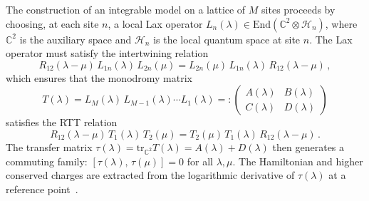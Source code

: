 \documentclass[11pt,a4paper]{article}
\theoremstyle{definition}
\begin{document}
The construction of an integrable model on a lattice of $M$ sites
proceeds by choosing, at each site $n$, a local Lax operator
$L_n(\lambda) \in \mathrm{End}(\mathbb{C}^2 \otimes
\mathcal{H}_n)$, where $\mathbb{C}^2$ is the auxiliary space and
$\mathcal{H}_n$ is the local quantum space at site $n$.  The Lax
operator must satisfy the intertwining relation
\begin{equation}\label{eq.RLL}
  R_{12}(\lambda - \mu)\,L_{1n}(\lambda)\,
  L_{2n}(\mu)
  = L_{2n}(\mu)\,L_{1n}(\lambda)\,
  R_{12}(\lambda - \mu)\,,
\end{equation}
which ensures that the monodromy matrix
\begin{equation}\label{eq.monodromy}
  T(\lambda) = L_M(\lambda)\,L_{M-1}(\lambda)
  \cdots L_1(\lambda)
  =:
  \begin{pmatrix}
    A(\lambda) & B(\lambda) \\ C(\lambda) & D(\lambda)
  \end{pmatrix}
\end{equation}
satisfies the RTT relation
\begin{equation}\label{eq.RTT}
  R_{12}(\lambda - \mu)\,T_1(\lambda)\,T_2(\mu)
  = T_2(\mu)\,T_1(\lambda)\,R_{12}(\lambda - \mu)\,.
\end{equation}
The transfer matrix $\tau(\lambda) = \mathrm{tr}_{\mathbb{C}^2}
T(\lambda) = A(\lambda) + D(\lambda)$ then generates a commuting
family: $[\tau(\lambda),\,\tau(\mu)] = 0$ for all $\lambda, \mu$.
The Hamiltonian and higher conserved charges are extracted from the
logarithmic derivative of $\tau(\lambda)$ at a reference
point~\cite{TarasovTakhtajanFaddeev1983, KorepinBogoliubovIzergin1993}.
\end{document}
